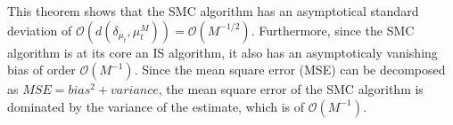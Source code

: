 This theorem shows that the SMC algorithm has an asymptotical standard deviation of $\mathcal{O}(d(\delta_{\mu_t}, \mu^M_t)) = \mathcal{O}(M^{-1/2})$. Furthermore, since the SMC algorithm is at its core an IS algorithm, it also has an asymptoticaly vanishing bias of order $\mathcal{O}(M^{-1})$. Since the mean square error (MSE) can be decomposed as $MSE = bias^2 + variance$, the mean square error of the SMC algorithm is dominated by the variance of the estimate, which is of $\mathcal{O}(M^{-1})$.

